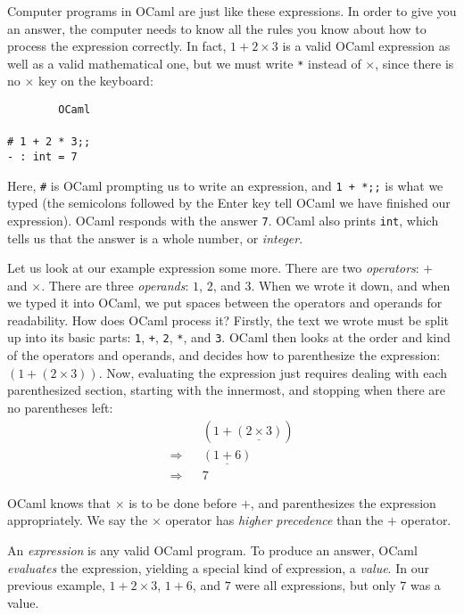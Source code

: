 \documentclass[]{book}
\newcommand{\smspace}{\vspace{4mm}}
\begin{document}
Computer programs in OCaml are just like these expressions. In order to give
you an answer, the computer needs to know all the rules you know about how to
process the expression correctly.  In fact, $1 + 2 \times 3$ is a valid OCaml
expression as well as a valid mathematical one, but we must write \verb!*! instead
of $\times$, since there is no $\times$ key on the keyboard: 

\smspace
\noindent\verb!        OCaml!\\
\noindent\\
\noindent\verb!# 1 + 2 * 3;;!\\
\noindent\verb!- : int = 7!
\smspace

\noindent Here, \verb!#! is OCaml prompting us to write an expression, and
\texttt{1\! +\! *;;} is what we typed (the semicolons followed by the Enter
key tell OCaml we have finished our expression). OCaml responds with the answer
\verb!7!. OCaml also prints \verb!int!, which tells us that the answer is a
whole number, or \textit{integer}.

Let us look at our example expression some more. There are two \textit{operators}: $+$ and $\times$. There are three \textit{operands}: $1$,
$2$, and $3$.  When we wrote it down,
and when we typed it into OCaml, we put spaces between the operators and
operands for readability. How does OCaml process it? Firstly, the text we wrote must be split up into its
basic parts: \verb!1!, \verb!+!, \verb!2!, \verb!*!, and \verb!3!. OCaml then
looks at the order and kind of the operators and operands, and decides how to
parenthesize the expression: $(1 + (2 \times 3))$. Now,  evaluating the expression
just requires dealing with each parenthesized section, starting with the innermost, and stopping when there are no parentheses left:
\begin{eqnarray*}
 & & (1 + \underline{(2 \times 3)}) \\
 \Longrightarrow & & \underline{(1 + 6)} \\
 \Longrightarrow & & 7
\end{eqnarray*}

\noindent OCaml knows that $\times$ is to be done before $+$, and parenthesizes the expression appropriately. We say the $\times$ operator has \textit{higher precedence} than the $+$ operator.

An \textit{expression} is any valid OCaml program. To produce an answer, OCaml
\textit{evaluates} the expression, yielding a special kind of expression, a
\textit{value}. In our previous example, $1 + 2 \times 3$, $1 + 6$, and $7$ were all
expressions, but only $7$ was a value.
\end{document}
